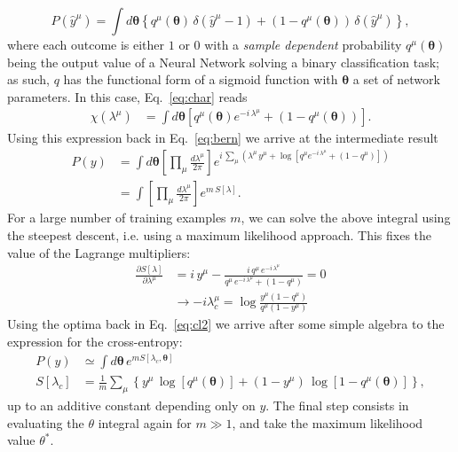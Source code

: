 \documentclass{article}
\begin{document}
%
\begin{equation} \label{eq:bern}
P(\hat{y}^{\mu} ) = \int d\boldsymbol{\theta} \left\{ q^{\mu}(\boldsymbol{\theta}) \, \delta(\hat{y}^{\mu}-1 ) + (1-q^{\mu}(\boldsymbol{\theta}) ) \, \delta(\hat{y}^{\mu}) \right\},
\end{equation}
%
where each outcome is either $1$ or $0$ with a {\it sample dependent} probability $q^{\mu}(\boldsymbol{\theta})$ being the output value of a Neural Network solving a binary classification task; as such, $q$ has the functional form of a sigmoid function with $\boldsymbol{\theta}$ a set of network parameters. In this case, Eq.~\eqref{eq:char} reads
\begin{align} \label{eq:char}
 \chi(\lambda^{\mu}) &=  \int  d\boldsymbol{\theta} \left[ q^{\mu}(\boldsymbol{\theta} ) e^{-i \, \lambda^{\mu} } +(1-q^{\mu}(\boldsymbol{\theta} )) \right].
 \end{align}
%
Using this expression back in Eq.~\eqref{eq:bern} we arrive at the intermediate result
%
 \begin{align} \label{eq:cl2}
 P(y) &= \int d\boldsymbol{\theta} \left[ \prod_{\mu}  \frac{d\lambda^{\mu}}{2\pi} \right] e^{i \, \sum_{\mu} ( \lambda^{\mu} \, y^{\mu} + \log \left[ q^{\mu} e^{-i \, \lambda^{\mu} } +(1-q^{\mu}) \right] )}  \\ \nonumber
 &=  \int  \left[ \prod_{\mu}  \frac{d\lambda^{\mu}}{2\pi} \right] e^{m \, S[\lambda]}.
 \end{align}
%
For a large number of training examples $m$, we can solve the above integral using the steepest descent, i.e. using a maximum likelihood approach. This fixes the value of the Lagrange multipliers:
%
\begin{align} \label{eq:cl3}
\frac{\partial S[\lambda]}{\partial \lambda^{\mu}} &= i \, y^{\mu} - \frac{i \, q^{\mu} \, e^{-i \, \lambda^{\mu}}}{q^{\mu} \, e^{-i \, \lambda^{\mu}} + (1-q^{\mu})} = 0 \\ \nonumber
&\rightarrow - i \lambda^{\mu}_{c} =  \log \frac{y^{\mu}(1-q^{\mu}) }{q^{\mu}(1- y^{\mu})}
\end{align}
%
Using the optima back in Eq.~\eqref{eq:cl2} we arrive after some simple algebra to the expression for the cross-entropy:
%
\begin{align} \label{eq:cl3}
P(y) &\simeq \int d\boldsymbol{\theta} \, e^{m S[\lambda_c, \boldsymbol{\theta}]} \\ \nonumber
S[\lambda_c] &= \frac{1}{m} \sum_{\mu} \left\{ y^{\mu} \, \log [ q^{\mu}( \boldsymbol{\theta} ) ] + (1-y^{\mu}) \, \log [1-q^{\mu}( \boldsymbol{\theta}) ] \right\},
\end{align}
%
up to an additive constant depending only on $y$. The final step consists in evaluating the $\theta$ integral again for $m \gg 1$, and take the maximum likelihood value $\theta^*$.
\end{document}
